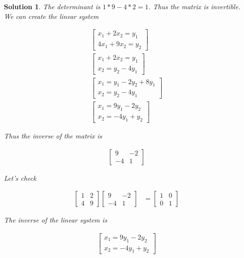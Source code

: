 \documentclass{article}
\newtheorem*{solution}{Solution}
\begin{document}
\begin{solution}
The determinant is  $1 * 9 - 4 * 2 = 1$. Thus the matrix is invertible. We can create the linear system

\begin{align*}
\begin{bmatrix}
x_{1} + 2x_{2} = y_{1} \\
4x_{1} + 9x_{2} = y_{2}
\end{bmatrix} \\
\begin{bmatrix}
x_{1} + 2x_{2} = y_{1} \\
x_{2} = y_{2} - 4y_{1}
\end{bmatrix} \\
\begin{bmatrix}
x_{1} = y_{1} - 2y_{2} + 8y_{1} \\
x_{2} = y_{2} - 4y_{1}
\end{bmatrix} \\
\begin{bmatrix}
x_{1} = 9y_{1} - 2y_{2} \\
x_{2} = -4y_{1} + y_{2}
\end{bmatrix} 
\end{align*}

Thus the inverse of the matrix is

\begin{align*}
\begin{bmatrix}
9 & -2 \\ -4 & 1
\end{bmatrix}
\end{align*}

Let's check

\begin{align*}
\begin{bmatrix}
1 & 2 \\ 4 & 9
\end{bmatrix}
\begin{bmatrix}
9 & -2 \\ -4 & 1
\end{bmatrix} 
&=
\begin{bmatrix}
1 & 0 \\ 0 & 1
\end{bmatrix}
\end{align*}

The inverse of the linear system is 

\begin{align*}
\begin{bmatrix}
x_{1} = 9y_{1} - 2y_{2} \\
x_{2} = -4y_{1} + y_{2}
\end{bmatrix} 
\end{align*}


\end{solution}
\end{document}

